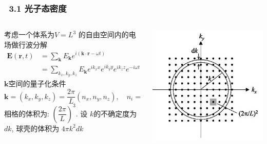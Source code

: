     \begin{frame} 
    \frametitle{~3.1 光子态密度 }
        
    \begin{columns}
        \begin{column}[t]{0.69\linewidth} 
                考虑一个体系为$V=L^3$ 的自由空间内的电场做行波分解
                \[ \begin{aligned}
                    \mathbf{E}(\mathbf{r},t) &= \sum _\mathbf{k} E_\mathbf{k} e^{i( \mathbf{k}\cdot \mathbf{r} -\omega t )}\\
                        &= \sum _{k_x, k_y, k_z} E_\mathbf{k} e^{i k_x x }e^{i k_y y } e^{i k_z z }  e^{-i \omega t}
                \end{aligned}\] 
            $\mathbf{k}$空间的量子化条件
            \[ \mathbf{k} = (k_x, k_y, k_z) = \frac{2\pi}{L} (n_x, n_y, n_z), \quad n_i =0, \pm 1, \pm 2, \cdots  \]
            相格的体积为: $(\dfrac{2\pi}{L})^3$. 设 $k$的不确定度为 $d k$, 球壳的体积为 $4 \pi k^2 d k$
        \end{column}
        \begin{column}[t]{0.30\linewidth}
              \begin{center}
                   \includegraphics[width=1.0\textwidth]{figs/2022-05-26-11-17-12.png}
              \end{center}
        \end{column}
    \end{columns}
\end{frame}

